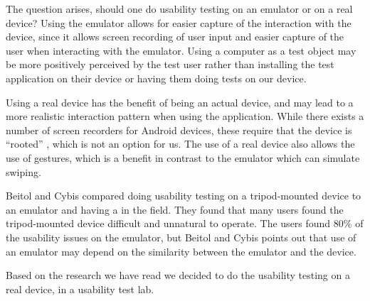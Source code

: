 The question arises, should one do usability testing on an emulator or on a real device?
Using the emulator allows for easier capture of the interaction with the device, since it allows screen recording of user input and easier capture of the user when interacting with the emulator. Using a computer as a test object may be more positively perceived by the test user rather than installing the test application on their device or having them doing tests on our device. 

Using a real device has the benefit of being an actual device, and may lead to a more realistic interaction pattern when using the application. While there exists a number of screen recorders for Android devices, these require that the device is ``rooted'' \cite{androidrooting}, which is not an option for us. 
The use of a real device also allows the use of gestures, which is a benefit in contrast to the emulator which can simulate swiping. 


Beitol and Cybis \cite{betiol2005usability} compared doing usability testing on a tripod-mounted device to an emulator and having a in the field. They found that many users found the tripod-mounted device difficult and unnatural to operate. The users found 80\% of the usability issues on the emulator, but Beitol and Cybis points out that use of an emulator may depend on the similarity between the emulator and the device. 

Based on the research we have read we decided to do the usability testing on a real device, in a usability test lab.
